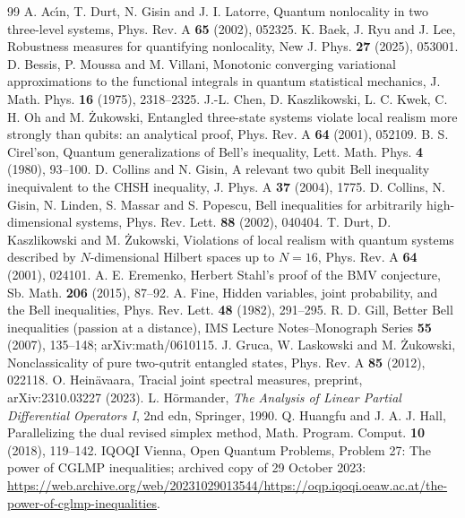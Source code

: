 \documentclass[11pt]{amsart}
\theoremstyle{definition}
\theoremstyle{remark}
\numberwithin{equation}{section}
\begin{document}
\begin{thebibliography}{99}
 A. Ac\'{\i}n, T. Durt, N. Gisin and J. I. Latorre, Quantum nonlocality in two three-level systems, Phys.
Rev. A \textbf{65} (2002), 052325.
 K. Baek, J. Ryu and J. Lee, Robustness measures for quantifying nonlocality, New J. Phys. \textbf{27}
(2025), 053001.
 D. Bessis, P. Moussa and M. Villani, Monotonic converging variational approximations to the functional
integrals in quantum statistical mechanics, J. Math. Phys. \textbf{16} (1975), 2318--2325.
 J.-L. Chen, D. Kaszlikowski, L. C. Kwek, C. H. Oh and M. \.Zukowski, Entangled three-state systems
violate local realism more strongly than qubits: an analytical proof, Phys. Rev. A \textbf{64} (2001), 052109.
 B. S. Cirel'son, Quantum generalizations of Bell's inequality, Lett. Math. Phys. \textbf{4} (1980),
93--100.
 D. Collins and N. Gisin, A relevant two qubit Bell inequality inequivalent to the CHSH
inequality, J. Phys. A \textbf{37} (2004), 1775.
 D. Collins, N. Gisin, N. Linden, S. Massar and S. Popescu, Bell inequalities for arbitrarily
high-dimensional systems, Phys. Rev. Lett. \textbf{88} (2002), 040404.
 T. Durt, D. Kaszlikowski and M. \.Zukowski, Violations of local realism with quantum systems described
by $N$-dimensional Hilbert spaces up to $N=16$, Phys. Rev. A \textbf{64} (2001), 024101.
 A. E. Eremenko, Herbert Stahl's proof of the BMV conjecture, Sb. Math. \textbf{206} (2015), 87--92.
 A. Fine, Hidden variables, joint probability, and the Bell inequalities, Phys. Rev. Lett. \textbf{48}
(1982), 291--295.
 R. D. Gill, Better Bell inequalities (passion at a distance), IMS Lecture Notes--Monograph Series
\textbf{55} (2007), 135--148; arXiv:math/0610115.
 J. Gruca, W. Laskowski and M. \.Zukowski, Nonclassicality of pure two-qutrit entangled states, Phys. Rev.
A \textbf{85} (2012), 022118.
 O. Hein\"avaara, Tracial joint spectral measures, preprint, arXiv:2310.03227 (2023).
 L. H\"ormander, \emph{The Analysis of Linear Partial Differential Operators I}, 2nd edn,
Springer, 1990.
 Q. Huangfu and J. A. J. Hall, Parallelizing the dual revised simplex method, Math. Program. Comput.
\textbf{10} (2018), 119--142.
 IQOQI Vienna, Open Quantum Problems, Problem 27: The power of CGLMP inequalities; archived copy of 29
October 2023:
\url{https://web.archive.org/web/20231029013544/https://oqp.iqoqi.oeaw.ac.at/the-power-of-cglmp-inequalities}.

\end{thebibliography}
\end{document}
